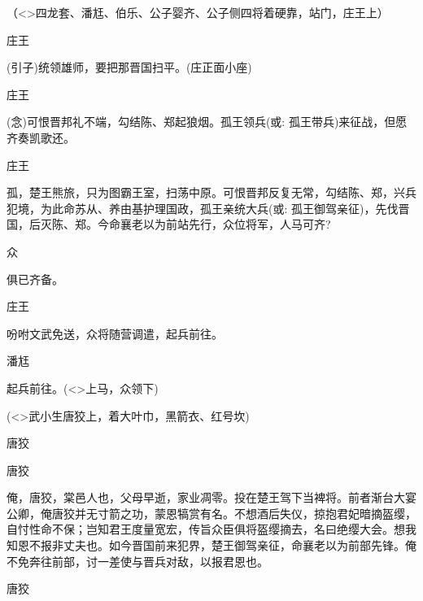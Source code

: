 {（\textless{}\!\textgreater{}四龙套、潘尪、伯乐、公子婴齐、公子侧四将着硬靠，站门，庄王上）

庄王\hspace{30pt}~

({\akai 引子})统领雄师，要把那晋国扫平。(庄正面小座)

庄王

({\akai 念})可恨晋邦礼不端，勾结陈、郑起狼烟。孤王领兵({\akai 或}: 孤王带兵)来征战，但愿齐奏凯歌还。

庄王

孤，楚王熊旅，只为图霸王室，扫荡中原。可恨晋邦反复无常，勾结陈、郑，兴兵犯境，为此命苏从、养由基护理国政，孤王亲统大兵({\akai 或}: 孤王御驾亲征)，先伐晋国，后灭陈、郑。今命襄老以为前站先行，众位将军，人马可齐?

众\hspace{40pt}~

俱已齐备。

庄王\hspace{30pt}~

吩咐文武免送，众将随营调遣，起兵前往。

潘尪\hspace{30pt}~

起兵前往。(\textless{}\!\textgreater{}上马，众领下)

\vspace{5pt}

(\textless{}\!\textgreater{}武小生唐狡上，着大叶巾，黑箭衣、红号坎)

唐狡


唐狡

俺，唐狡，棠邑人也，父母早逝，家业凋零。投在楚王驾下当裨将。前者渐台大宴公卿，俺唐狡并无寸箭之功，蒙恩犒赏有名。不想酒后失仪，掠抱君妃暗摘盔缨，自忖性命不保；岂知君王度量宽宏，传旨众臣俱将盔缨摘去，名曰绝缨大会。想我知恩不报非丈夫也。如今晋国前来犯界，楚王御驾亲征，命襄老以为前部先锋。俺不免奔往前部，讨一差使与晋兵对敌，以报君恩也。

唐狡


\vspace{5pt}

}
